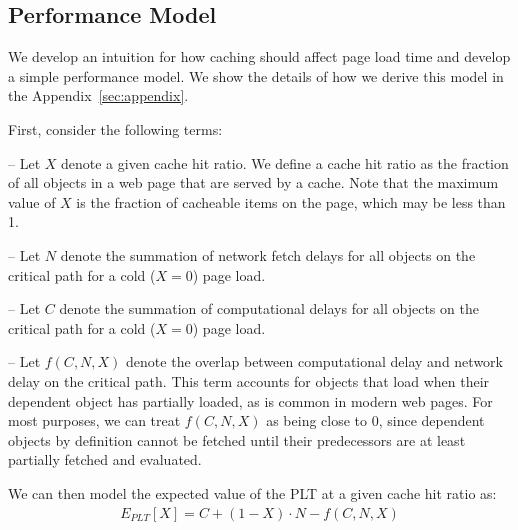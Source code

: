 

\subsection{Performance Model}
\label{subsec:model}

We develop an intuition for how caching should affect page load
time and develop a simple performance model. We show the details of how we derive
this model in the Appendix~\ref{sec:appendix}.

First, consider the following terms:

\noindent-- Let $X$ denote a given cache hit ratio. We define a cache hit ratio as the fraction
of all objects in a web page that are served by a cache. Note that the maximum
value of $X$ is the fraction of cacheable items on the page, which may be less than 1.

\noindent-- Let $N$ denote the summation of network fetch delays for all objects on the
critical path for a cold ($X=0$) page load.

\noindent-- Let $C$ denote the summation of computational delays for all
objects on the critical path for a cold ($X=0$) page load.

\noindent-- Let $f(C, N, X)$ denote the overlap between computational delay and
network delay on the critical path. 
This term accounts for objects that load when their dependent object has partially loaded, as is common in modern web pages.
For most purposes, we can treat $f(C, N, X)$
as being close to 0, since dependent objects by definition cannot be fetched
until their predecessors are at least partially fetched and evaluated.

We can then model the expected value of the PLT at a given cache hit ratio as:
\begin{align*}
E_{PLT}[X] = C + (1 - X) \cdot N - f(C,N,X)
\end{align*}

